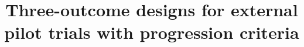 \documentclass{bmcart}
\begin{document}
\begin{frontmatter}

\begin{fmbox}


\title{Three-outcome designs for external pilot trials with progression criteria}


\author[
   addressref={aff1},                   %
   email={d.t.wilson@leeds.ac.uk}   %
]{ }
\author[
   addressref={aff1},
   email={john.RS.Smith@cambridge.co.uk}
]{ }


\address[id=aff1]{%
  , %
  ,                              %
}



\end{fmbox}
\end{frontmatter}
\end{document}
